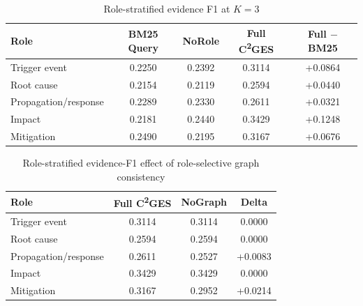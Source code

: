 \documentclass[11pt,letterpaper]{article}
\newcommand{\cges}{C\textsuperscript{2}GES}
\begin{document}
\begin{table}[ht]
\centering
\small
\caption{Role-stratified evidence F1 at $K=3$}
\begin{tabular}{lcccc}
\toprule
\textbf{Role} & \textbf{BM25 Query} & \textbf{NoRole} & \textbf{Full \cges{}} & \textbf{Full $-$ BM25} \\
\midrule
Trigger event & 0.2250 & 0.2392 & 0.3114 & +0.0864 \\
Root cause & 0.2154 & 0.2119 & 0.2594 & +0.0440 \\
Propagation/response & 0.2289 & 0.2330 & 0.2611 & +0.0321 \\
Impact & 0.2181 & 0.2440 & 0.3429 & +0.1248 \\
Mitigation & 0.2490 & 0.2195 & 0.3167 & +0.0676 \\
\bottomrule
\end{tabular}
\end{table}

\begin{table}[ht]
\centering
\small
\caption{Role-stratified evidence-F1 effect of role-selective graph consistency}
\begin{tabular}{lccc}
\toprule
\textbf{Role} & \textbf{Full \cges{}} & \textbf{NoGraph} & \textbf{Delta} \\
\midrule
Trigger event & 0.3114 & 0.3114 & 0.0000 \\
Root cause & 0.2594 & 0.2594 & 0.0000 \\
Propagation/response & 0.2611 & 0.2527 & +0.0083 \\
Impact & 0.3429 & 0.3429 & 0.0000 \\
Mitigation & 0.3167 & 0.2952 & +0.0214 \\
\bottomrule
\end{tabular}
\end{table}
\end{document}
